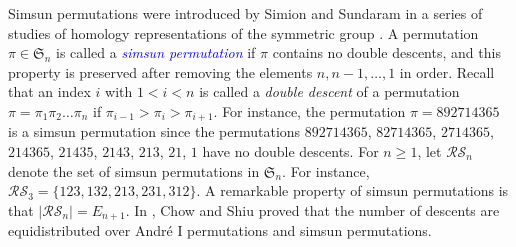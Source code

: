 \documentclass[12pt]{article}
\def\blue{\textcolor{blue}}
\def\blue{\textcolor{blue}}
\numberwithin{equation}{section}
\def\blue{\textcolor{blue}}
\def\blue{\textcolor{blue}}
\theoremstyle{plain}
\begin{document}
    Simsun permutations were introduced by   Simion and  Sundaram in a series of studies of homology representations of the symmetric
    group  \cite{Su94, Su95, Su96}.  A permutation $\pi\in \mathfrak{S}_n$ is called a  \blue{\em simsun permutation} if $\pi$  contains no double descents, and this property is preserved after removing the elements
    $n,n-1, \ldots, 1$ in order.
    Recall that an index $i$ with $1<i<n$ is  called a {\em double descent} of a permutation $\pi=\pi_1\pi_2\ldots \pi_n$  if $\pi_{i-1}>\pi_i>\pi_{i+1}$. For instance, the permutation 
    $\pi=892714365$ is a simsun permutation since the permutations $892714365$, $82714365$, $2714365$, $214365$, $21435$, $2143$, $213$, $21$, $1$ have no double descents. 
     For $n\geq 1$, let $\mathcal{RS}_{n}$ denote the set of simsun permutations in $\mathfrak{S}_n$.  For instance,  $\mathcal{RS}_3=\{123, 132, 213, 231, 312\}$.  A remarkable property of simsun permutations is that $|\mathcal{RS}_n|= E_{n+1}$. 
    In \cite{CS11}, Chow and  Shiu
    proved  that the number of descents are equidistributed
    over Andr\'e $\mathrm{I}$ permutations and simsun permutations.
   
    
   
\end{document}
